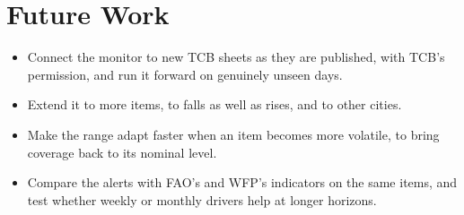 \section{Future Work}
\begin{itemize}[leftmargin=*,itemsep=2pt]
\item Connect the monitor to new TCB sheets as they are published, with TCB's permission, and run it forward on genuinely unseen days.
\item Extend it to more items, to falls as well as rises, and to other cities.
\item Make the range adapt faster when an item becomes more volatile, to bring coverage back to its nominal level.
\item Compare the alerts with FAO's and WFP's indicators on the same items, and test whether weekly or monthly drivers help at longer horizons.
\end{itemize}
